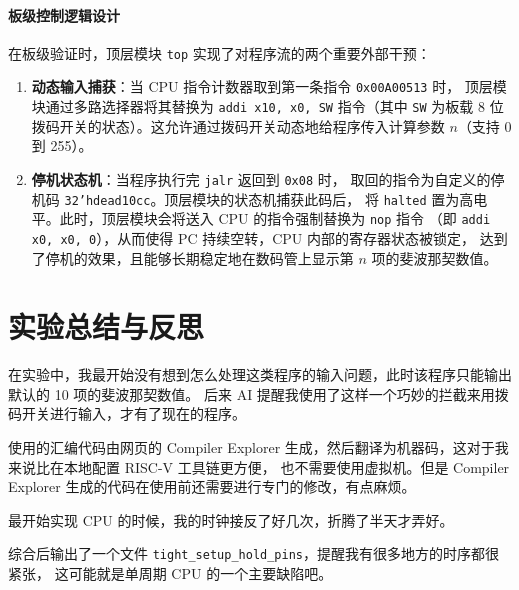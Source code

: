 \documentclass[12pt, a4paper]{ctexart}
\begin{document}
\paragraph{板级控制逻辑设计}
在板级验证时，顶层模块 \texttt{top} 实现了对程序流的两个重要外部干预：
\begin{enumerate}
    \item \textbf{动态输入捕获}：当 CPU 指令计数器取到第一条指令 \texttt{0x00A00513} 时，
    顶层模块通过多路选择器将其替换为 \texttt{addi x10, x0, SW} 指令（其中 \texttt{SW}
    为板载 8 位拨码开关的状态）。这允许通过拨码开关动态地给程序传入计算参数 $n$（支持 0 到 255）。
    \item \textbf{停机状态机}：当程序执行完 \texttt{jalr} 返回到 \texttt{0x08} 时，
    取回的指令为自定义的停机码 \texttt{32'hdead10cc}。顶层模块的状态机捕获此码后，
    将 \texttt{halted} 置为高电平。此时，顶层模块会将送入 CPU 的指令强制替换为 \texttt{nop} 指令
    （即 \texttt{addi x0, x0, 0}），从而使得 PC 持续空转，CPU 内部的寄存器状态被锁定，
    达到了停机的效果，且能够长期稳定地在数码管上显示第 $n$ 项的斐波那契数值。
\end{enumerate}

\section{实验总结与反思}

在实验中，我最开始没有想到怎么处理这类程序的输入问题，此时该程序只能输出默认的 10 项的斐波那契数值。
后来 AI 提醒我使用了这样一个巧妙的拦截来用拨码开关进行输入，才有了现在的程序。

使用的汇编代码由网页的 Compiler Explorer 生成，然后翻译为机器码，这对于我来说比在本地配置 RISC-V 工具链更方便，
也不需要使用虚拟机。但是 Compiler Explorer 生成的代码在使用前还需要进行专门的修改，有点麻烦。

最开始实现 CPU 的时候，我的时钟接反了好几次，折腾了半天才弄好。

综合后输出了一个文件 \texttt{tight\_setup\_hold\_pins}，提醒我有很多地方的时序都很紧张，
这可能就是单周期 CPU 的一个主要缺陷吧。
\end{document}
